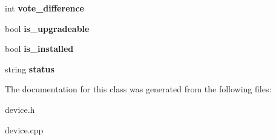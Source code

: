 \begin{DoxyCompactItemize}
int {\bfseries vote\+\_\+difference}
\item 
\mbox{\label{classDevice_a1ab968c173c863b0ceccb7418c0a281c}} 
bool {\bfseries is\+\_\+upgradeable}
\item 
\mbox{\label{classDevice_ad62a2bdc698beba3b477a587afaeb1f3}} 
bool {\bfseries is\+\_\+installed}
\item 
\mbox{\label{classDevice_ad3cd9d9d8054a8ef1a136ded17d2fff7}} 
string {\bfseries status}
\end{DoxyCompactItemize}


The documentation for this class was generated from the following files\+:\begin{DoxyCompactItemize}
\item 
device.\+h\item 
device.\+cpp\end{DoxyCompactItemize}

